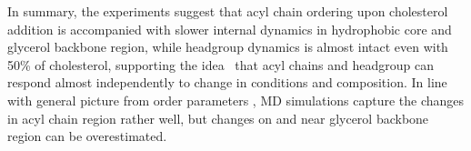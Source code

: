 \documentclass[journal=jcisd8,manuscript=article,layout=twocolumn]{achemso}
\begin{document}


In summary, the experiments suggest that acyl chain ordering upon cholesterol addition is accompanied
with slower internal dynamics in hydrophobic core and glycerol backbone region, while headgroup dynamics is almost
intact even with 50\% of cholesterol, supporting the idea~\cite{citetoarcihved} that acyl chains and headgroup can respond
almost independently to change in conditions and composition.
In line with general picture from order parameters \cite{ollila16}, MD simulations capture the changes
in acyl chain region rather well, but changes on and near glycerol backbone region can be overestimated.
\end{document}

